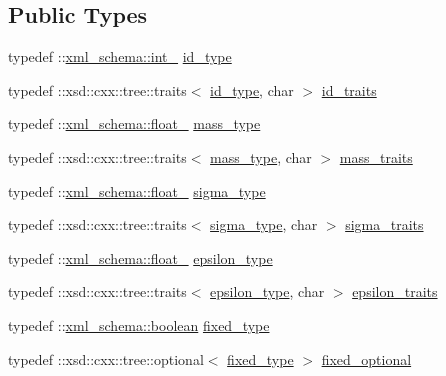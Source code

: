 \subsection*{Public Types}
\begin{DoxyCompactItemize}
\item 
typedef \+::\hyperlink{namespacexml__schema_acfa24ac68e1a188e7f44c36f7a158bf4}{xml\+\_\+schema\+::int\+\_\+} \hyperlink{classparticletype__t_af4592f0136ed3224434007bc7f5c7fd4}{id\+\_\+type}
\item 
typedef \+::xsd\+::cxx\+::tree\+::traits$<$ \hyperlink{classparticletype__t_af4592f0136ed3224434007bc7f5c7fd4}{id\+\_\+type}, char $>$ \hyperlink{classparticletype__t_ae11ed5b066a4f0eff6a0fd5c848242be}{id\+\_\+traits}
\item 
typedef \+::\hyperlink{namespacexml__schema_ad7e04ab17bba0b3fdde43fb79ef6ed87}{xml\+\_\+schema\+::float\+\_\+} \hyperlink{classparticletype__t_a7ebd18e57b545977bf3d1573ffa395f7}{mass\+\_\+type}
\item 
typedef \+::xsd\+::cxx\+::tree\+::traits$<$ \hyperlink{classparticletype__t_a7ebd18e57b545977bf3d1573ffa395f7}{mass\+\_\+type}, char $>$ \hyperlink{classparticletype__t_ac0e07de539bf88441c980a15bb88e1c9}{mass\+\_\+traits}
\item 
typedef \+::\hyperlink{namespacexml__schema_ad7e04ab17bba0b3fdde43fb79ef6ed87}{xml\+\_\+schema\+::float\+\_\+} \hyperlink{classparticletype__t_abbac1ed447872eb2db5cc90f2c1e1a6c}{sigma\+\_\+type}
\item 
typedef \+::xsd\+::cxx\+::tree\+::traits$<$ \hyperlink{classparticletype__t_abbac1ed447872eb2db5cc90f2c1e1a6c}{sigma\+\_\+type}, char $>$ \hyperlink{classparticletype__t_aa2caef2ce2ef568f535961d3ab84df2a}{sigma\+\_\+traits}
\item 
typedef \+::\hyperlink{namespacexml__schema_ad7e04ab17bba0b3fdde43fb79ef6ed87}{xml\+\_\+schema\+::float\+\_\+} \hyperlink{classparticletype__t_a94692265645066b820b0e4c308c1566f}{epsilon\+\_\+type}
\item 
typedef \+::xsd\+::cxx\+::tree\+::traits$<$ \hyperlink{classparticletype__t_a94692265645066b820b0e4c308c1566f}{epsilon\+\_\+type}, char $>$ \hyperlink{classparticletype__t_aba72bd9fc1660ca66d7294ea79e6a32e}{epsilon\+\_\+traits}
\item 
typedef \+::\hyperlink{namespacexml__schema_ae5ada4ec9c54b51765c3e4c0e9631bba}{xml\+\_\+schema\+::boolean} \hyperlink{classparticletype__t_a689bb940332f300e99acdf3d50ffdc2c}{fixed\+\_\+type}
\item 
typedef \+::xsd\+::cxx\+::tree\+::optional$<$ \hyperlink{classparticletype__t_a689bb940332f300e99acdf3d50ffdc2c}{fixed\+\_\+type} $>$ \hyperlink{classparticletype__t_a42eca3b383084472937b0ad4f370bbb2}{fixed\+\_\+optional}

\end{DoxyCompactItemize}
